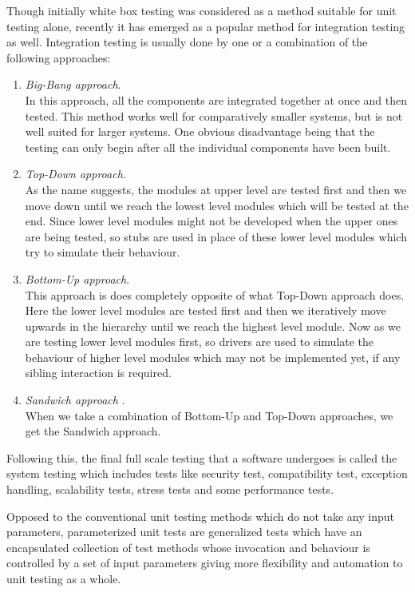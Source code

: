 Though initially white box testing was considered as a method suitable for unit testing alone, recently it has emerged as a popular method for integration testing as well. Integration testing is usually done by one or a combination of the following approaches: 
\begin{enumerate}[\IEEEsetlabelwidth{Z}]
\item \textit{Big-Bang approach}.\\In this approach, all the components are integrated together at once and then tested. This method works well for comparatively smaller systems, but is not well suited for larger systems. One obvious disadvantage being that the testing can only begin after all the individual components have been built.
\item \textit{Top-Down approach}.\\As the name suggests, the modules at upper level are tested first and then we move down until we reach the lowest level modules which will be tested at the end. Since lower level modules might not be developed when the upper ones are being tested, so stubs are used in place of these lower level modules which try to simulate their behaviour.
\item \textit{Bottom-Up approach}.\\This approach is does completely opposite of what Top-Down approach does. Here the lower level modules are tested first and then we iteratively move upwards in the hierarchy until we reach the highest level module. Now as we are testing lower level modules first, so drivers are used to simulate the behaviour of higher level modules which may not be implemented yet, if any sibling interaction is required. 
\item \textit{Sandwich approach} .\\ When we take a combination of Bottom-Up and Top-Down approaches, we get the Sandwich approach.
\end{enumerate}
Following this, the final full scale testing that a software undergoes is called the system testing which includes tests like security test, compatibility test, exception handling, scalability tests, stress tests and some performance tests. 

Opposed to the conventional unit testing methods which do not take any input parameters, parameterized unit tests \cite{tillmann2010parameterized} are generalized tests which have an encapsulated collection of test methods whose invocation and behaviour is controlled by a set of input parameters giving more flexibility and automation to unit testing as a whole.

